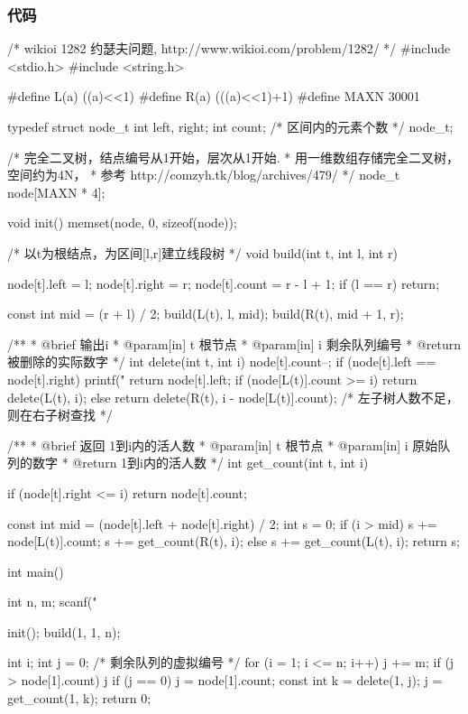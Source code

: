 \subsubsection{代码}
\begin{Codex}[label=josephus_problem.c]
/* wikioi 1282 约瑟夫问题, http://www.wikioi.com/problem/1282/ */
#include <stdio.h>
#include <string.h>

#define L(a) ((a)<<1)
#define R(a) (((a)<<1)+1)
#define MAXN 30001

typedef struct node_t {
    int left, right;
    int count; /* 区间内的元素个数 */
} node_t;

/* 完全二叉树，结点编号从1开始，层次从1开始.
 * 用一维数组存储完全二叉树，空间约为4N，
 * 参考 http://comzyh.tk/blog/archives/479/
 */
node_t node[MAXN * 4];

void init() {
    memset(node, 0, sizeof(node));
}

/* 以t为根结点，为区间[l,r]建立线段树 */
void build(int t, int l, int r) {
    node[t].left = l;
    node[t].right = r;
    node[t].count = r - l + 1;
    if (l == r) return;

    const int mid = (r + l) / 2;
    build(L(t), l, mid);
    build(R(t), mid + 1, r);
}

/**
 * @brief 输出i
 * @param[in] t 根节点
 * @param[in] i 剩余队列编号
 * @return 被删除的实际数字
 */
int delete(int t, int i) {
    node[t].count--;
    if (node[t].left == node[t].right) {
        printf("%
        return node[t].left;
    }
    if (node[L(t)].count >= i) return delete(L(t), i);
    else return delete(R(t), i - node[L(t)].count); /* 左子树人数不足，则在右子树查找 */
}

/**
 * @brief 返回 1到i内的活人数
 * @param[in] t 根节点
 * @param[in] i 原始队列的数字
 * @return 1到i内的活人数
 */
int get_count(int t, int i) {
    if (node[t].right <= i) return node[t].count;

    const int mid = (node[t].left + node[t].right) / 2;
    int s = 0;
    if (i > mid) {
        s += node[L(t)].count;
        s += get_count(R(t), i);
    } else
        s += get_count(L(t), i);
    return s;
}

int main() {
    int n, m;
    scanf("%

    init();
    build(1, 1, n);

    int i;
    int j = 0; /* 剩余队列的虚拟编号 */
    for (i = 1; i <= n; i++) {
        j += m;
        if (j > node[1].count)
            j %
        if (j == 0) j = node[1].count;
        const int k = delete(1, j);
        j = get_count(1, k);
    }
    return 0;
}
\end{Codex}

